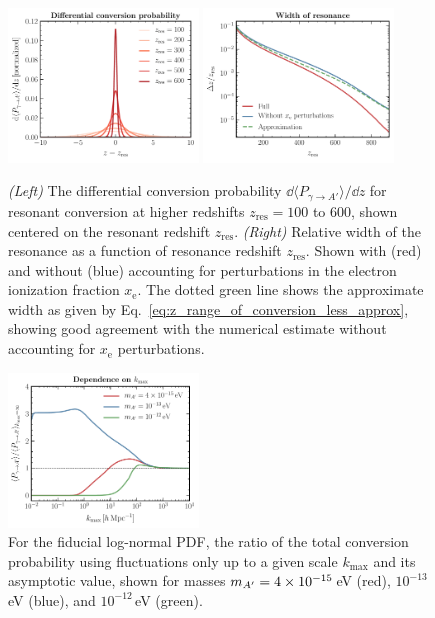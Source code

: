 \documentclass[prd,aps,10pt,nofootinbib,twocolumn,superscriptaddress,preprintnumbers,balancelastpage,longbibliography]{revtex4-1}
\begin{document}
%
\begin{figure}[htbp]
    \centering
    \includegraphics[width=0.45\textwidth]{plots/dP_dz_highz}
    \includegraphics[width=0.45\textwidth]{plots/sigma_z_res}
    \caption{\emph{(Left)} The differential conversion probability $\dd \langle P_{\gamma\to A'}\rangle / \dd z$ for resonant conversion at higher redshifts $z_\mathrm{res} = 100$ to $600$, shown centered on the resonant redshift $z_\mathrm{res}$. \emph{(Right)} Relative width of the resonance as a function of resonance redshift $z_\mathrm{res}$. Shown with (red) and without (blue) accounting for perturbations in the electron ionization fraction $x_\mathrm{e}$. The dotted green line shows the approximate width as given by Eq.~\eqref{eq:z_range_of_conversion_less_approx}, showing good agreement with the numerical estimate without accounting for $x_\text{e}$ perturbations.~} 
    \label{fig:dP_dz_highz}
\end{figure}
%
%
\begin{figure}[htbp]
    \centering
    \includegraphics[width=0.45\textwidth]{plots/P_k_max}
    \caption{For the fiducial log-normal PDF, the ratio of the total conversion probability using fluctuations only up to a given scale $k_\mathrm{max}$ and its asymptotic value, shown for masses $m_{A^\prime} = 4\times10^{-15}$\,eV (red), $10^{-13}$\,eV (blue), and $10^{-12}$\,eV (green).~} 
    \label{fig:P_k_max}
\end{figure}
%
\end{document}
